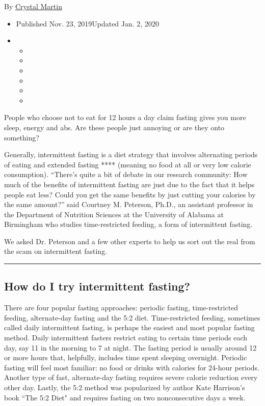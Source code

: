 By \href{https://www.nytimes3xbfgragh.onion/by/crystal-martin}{Crystal
Martin}

\begin{itemize}
\item
  Published Nov. 23, 2019Updated Jan. 2, 2020
\item
  \begin{itemize}
  \item
  \item
  \item
  \item
  \item
  \item
  \end{itemize}
\end{itemize}

People who choose not to eat for 12 hours a day claim fasting gives you
more sleep, energy and abs. Are these people just annoying or are they
onto something?

Generally, intermittent fasting is a diet strategy that involves
alternating periods of eating and extended fasting **** (meaning no food
at all or very low calorie consumption). ``There's quite a bit of debate
in our research community: How much of the benefits of intermittent
fasting are just due to the fact that it helps people eat less? Could
you get the same benefits by just cutting your calories by the same
amount?'' said Courtney M. Peterson, Ph.D., an assistant professor in
the Department of Nutrition Sciences at the University of Alabama at
Birmingham who studies time-restricted feeding, a form of intermittent
fasting.

We asked Dr. Peterson and a few other experts to help us sort out the
real from the scam on intermittent fasting.

\begin{center}\rule{0.5\linewidth}{\linethickness}\end{center}

\hypertarget{how-do-i-try-intermittent-fasting}{%
\subsection{How do I try intermittent
fasting?}\label{how-do-i-try-intermittent-fasting}}

There are four popular fasting approaches: periodic fasting,
time-restricted feeding, alternate-day fasting and the 5:2 diet.
Time-restricted feeding, sometimes called daily intermittent fasting, is
perhaps the easiest and most popular fasting method. Daily intermittent
fasters restrict eating to certain time periods each day, say 11 in the
morning to 7 at night. The fasting period is usually around 12 or more
hours that, helpfully, includes time spent sleeping overnight. Periodic
fasting will feel most familiar: no food or drinks with calories for
24-hour periods. Another type of fast, alternate-day fasting requires
severe calorie reduction every other day. Lastly, the 5:2 method was
popularized by author Kate Harrison's book ``The 5:2 Diet" and requires
fasting on two nonconsecutive days a week.

